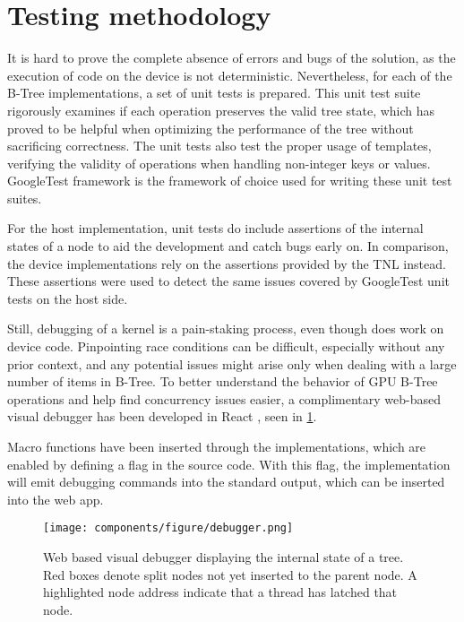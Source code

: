 \section{Testing methodology}

It is hard to prove the complete absence of errors and bugs of the solution, as the execution of code on the device is not deterministic. Nevertheless, for each of the B-Tree implementations, a set of unit tests is prepared. This unit test suite rigorously examines if each operation preserves the valid tree state, which has proved to be helpful when optimizing the performance of the tree without sacrificing correctness. The unit tests also test the proper usage of templates, verifying the validity of operations when handling non-integer keys or values. GoogleTest framework \cite{gtest} is the framework of choice used for writing these unit test suites.

For the host implementation, unit tests do include assertions of the internal states of a node to aid the development and catch bugs early on. In comparison, the device implementations rely on the assertions provided by the TNL instead. These assertions were used to detect the same issues covered by GoogleTest unit tests on the host side.

Still, debugging of a kernel is a pain-staking process, even though  does work on device code. Pinpointing race conditions can be difficult, especially without any prior context, and any potential issues might arise only when dealing with a large number of items in B-Tree. To better understand the behavior of GPU B-Tree operations and help find concurrency issues easier, a complimentary web-based visual debugger has been developed in React \cite{react}, seen in \cref{figure:debugger}.

Macro functions have been inserted through the implementations, which are enabled by defining a  flag in the source code. With this flag, the implementation will emit debugging commands into the standard output, which can be inserted into the web app.

\begin{figure}
  \centering
  \texttt{[image: components/figure/debugger.png]}
  \caption{Web based visual debugger displaying the internal state of a tree. Red boxes denote split nodes not yet inserted to the parent node. A highlighted node address indicate that a thread has latched that node.}
  \label{figure:debugger}
\end{figure}

